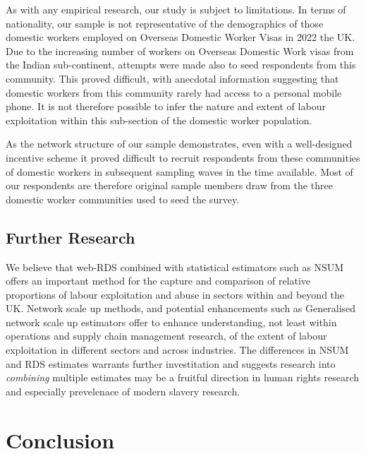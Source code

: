 \documentclass[
  12pt,
  letterpaper,
  DIV=11,
  numbers=noendperiod]{scrartcl}
\theoremstyle{plain}
\theoremstyle{definition}
\begin{document}
As with any empirical research, our study is subject to limitations. In
terms of nationality, our sample is not representative of the
demographics of those domestic workers employed on Overseas Domestic
Worker Visas in 2022 the UK. Due to the increasing number of workers on
Overseas Domestic Work visas from the Indian sub-continent, attempts
were made also to seed respondents from this community. This proved
difficult, with anecdotal information suggesting that domestic workers
from this community rarely had access to a personal mobile phone. It is
not therefore possible to infer the nature and extent of labour
exploitation within this sub-section of the domestic worker population.

As the network structure of our sample demonstrates, even with a
well-designed incentive scheme it proved difficult to recruit
respondents from these communities of domestic workers in subsequent
sampling waves in the time available. Most of our respondents are
therefore original sample members draw from the three domestic worker
communities used to seed the survey.

\subsection{Further Research}\label{further-research}

We believe that web-RDS combined with statistical estimators such as
NSUM offers an important method for the capture and comparison of
relative proportions of labour exploitation and abuse in sectors within
and beyond the UK. Network scale up methods, and potential enhancements
such as Generalised network scale up estimators offer to enhance
understanding, not least within operations and supply chain management
research, of the extent of labour exploitation in different sectors and
across industries. The differences in NSUM and RDS estimates warrants
further investitation and suggests research into \emph{combining}
multiple estimates may be a fruitful direction in human rights research
and especially prevelenace of modern slavery research.

\section{Conclusion}\label{conclusion}
\end{document}
